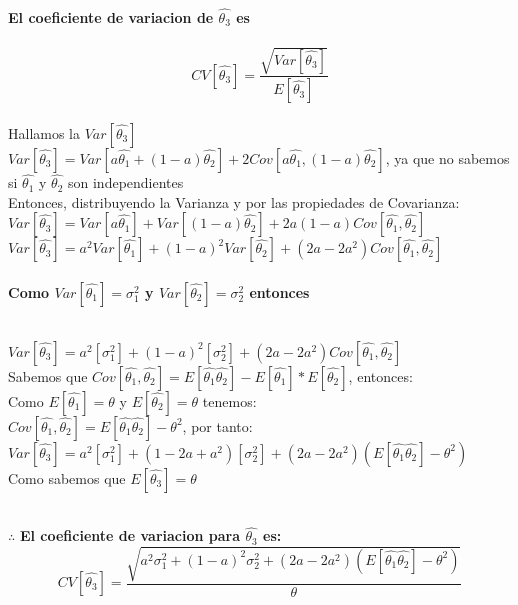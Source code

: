 \documentclass[letterpaper,12pt,onecolumn,titlepage]{article}
\begin{document}
~\\\textbf{ El coeficiente de variacion de $\hat{\theta_3}$ es}
~\\
~\\ $$CV[\hat{\theta_3}]=\frac{\sqrt{Var[\hat{\theta_3}]}}{E[\hat{\theta_3}]}$$
~\\ Hallamos la $Var[\hat{\theta_3}]$
~\\ $Var[\hat{\theta_3}]=Var[a{\hat{\theta_1}}+(1-a){\hat{\theta_2}}]+2Cov[a{\hat{\theta_1}},(1-a){\hat{\theta_2}}]$,    ya que no sabemos si ${\hat{\theta_1}}$ y ${\hat{\theta_2}}$ son independientes
~\\ Entonces, distribuyendo la Varianza y por las propiedades de Covarianza:
~\\ $Var[\hat{\theta_3}]=Var[a{\hat{\theta_1}}]+Var[(1-a){\hat{\theta_2}}]+2a(1-a) Cov[{\hat{\theta_1}},{\hat{\theta_2}}]$
~\\ $Var[\hat{\theta_3}]=a^2Var[{\hat{\theta_1}}]+(1-a)^2Var[{\hat{\theta_2}}]+(2a-2a^2)Cov[{\hat{\theta_1}},{\hat{\theta_2}}]$
~\\
~\\\textbf{Como $Var[{\hat{\theta_1}}]=\sigma_1^2$ y $Var[{\hat{\theta_2}}]=\sigma_2^2$ entonces}

~\\ $Var[\hat{\theta_3}]=a^2[\sigma_1^2]+(1-a)^2[\sigma_2^2]+(2a-2a^2)Cov[{\hat{\theta_1}},{\hat{\theta_2}}]$
~\\ Sabemos que $Cov[{\hat{\theta_1}},{\hat{\theta_2}}]= E[{\hat{\theta_1}}{\hat{\theta_2}}]- E[{\hat{\theta_1}}]*E[{\hat{\theta_2}}]$, entonces:
~\\ Como $E[{\hat{\theta_1}}]={\theta}$ y $E[{\hat{\theta_2}}]={\theta}$ tenemos:
~\\ $Cov[{\hat{\theta_1}},{\hat{\theta_2}}]=E[{\hat{\theta_1}}{\hat{\theta_2}}]-{\theta^2}$, por tanto:
~\\ $Var[\hat{\theta_3}]=a^2[\sigma_1^2]+(1-2a+a^2)[\sigma_2^2]+(2a-2a^2)(E[{\hat{\theta_1}}{\hat{\theta_2}}]-{\theta^2})$
~\\ Como sabemos que $E[\hat{\theta_3}]={\theta}$

~\\$\therefore$ \textbf{El coeficiente de variacion para $\hat{\theta_3}$ es:}  
$$CV[\hat{\theta_3}]=\frac{\sqrt{a^2\sigma_1^2+(1-a)^2\sigma_2^2+(2a-2a^2)(E[{\hat{\theta_1}}{\hat{\theta_2}}]-{\theta^2})}}{{\theta}}$$
\end{document}
